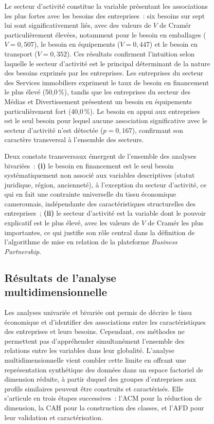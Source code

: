 \begin{figure}[H]
		Le secteur d'activité constitue la variable présentant les
		associations les plus fortes avec les besoins des entreprises~:
		six besoins sur sept lui sont significativement liés, avec des
		valeurs de $V$ de Cramér particulièrement élevées, notamment pour
		le besoin en emballages ($V = 0{,}507$), le besoin en équipements
		($V = 0{,}447$) et le besoin en transport ($V = 0{,}352$). Ces
		résultats confirment l'intuition selon laquelle le secteur d'activité
		est le principal déterminant de la nature des besoins exprimés par
		les entreprises. Les entreprises du secteur des Services immobiliers
		expriment le taux de besoin en financement le plus élevé (50,0\,\%),
		tandis que les entreprises du secteur des Médias et Divertissement
		présentent un besoin en équipements particulièrement fort (40,0\,\%).
		Le besoin en appui aux entreprises est le seul besoin pour lequel
		aucune association significative avec le secteur d'activité n'est
		détectée ($p = 0{,}167$), confirmant son caractère transversal à
		l'ensemble des secteurs.
		
		\begin{remarque}
			Deux constats transversaux émergent de l'ensemble des analyses
			bivariées~: \textbf{(i)} le besoin en financement est le seul besoin
			systématiquement non associé aux variables descriptives (statut
			juridique, région, ancienneté), à l'exception du secteur d'activité,
			ce qui en fait une contrainte universelle du tissu économique
			camerounais, indépendante des caractéristiques structurelles des
			entreprises~; \textbf{(ii)} le secteur d'activité est la variable
			dont le pouvoir explicatif est le plus élevé, avec les valeurs de
			$V$ de Cramér les plus importantes, ce qui justifie son rôle central
			dans la définition de l'algorithme de mise en relation de la
			plateforme \textit{Business Partnership}.
		\end{remarque}
		
		\subsection{Résultats de l'analyse multidimensionnelle}
		\label{subsec:multi}
		
		Les analyses univariée et bivariée ont permis de décrire le tissu
		économique et d'identifier des associations entre les caractéristiques
		des entreprises et leurs besoins. Cependant, ces méthodes ne
		permettent pas d'appréhender simultanément l'ensemble des relations
		entre les variables dans leur globalité. L'analyse multidimensionnelle
		vient combler cette limite en offrant une représentation synthétique
		des données dans un espace factoriel de dimension réduite, à partir
		duquel des groupes d'entreprises aux profils similaires peuvent être
		construits et caractérisés. Elle s'articule en trois étapes
		successives~: l'ACM pour la réduction de dimension, la CAH pour
		la construction des classes, et l'AFD pour leur validation et
		caractérisation.
		

\end{figure}
